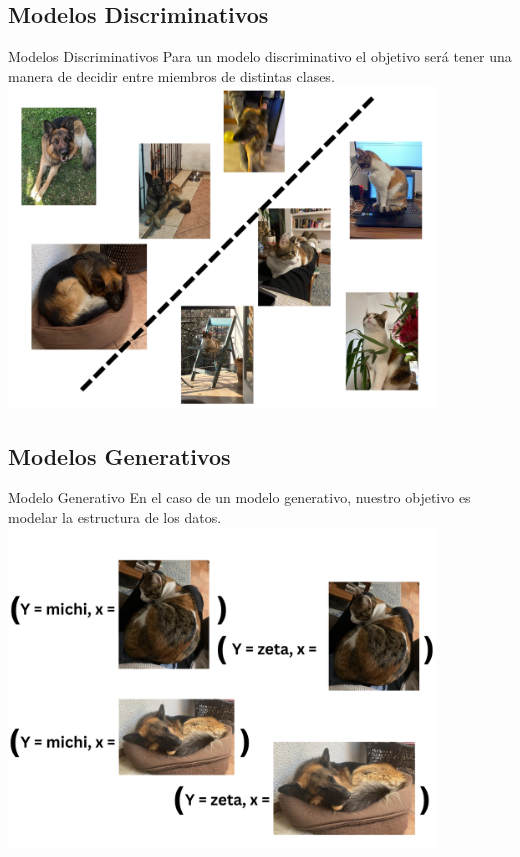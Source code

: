 \documentclass[9pt]{beamer}
\begin{document}
\subsection{Modelos Discriminativos}
\begin{frame}{Modelos Discriminativos}
    Para un modelo discriminativo el objetivo será tener una manera de decidir entre miembros de distintas clases.
    \includegraphics[width=0.85\textwidth]{diapositivas/img/discriminativo.png}
\end{frame}

\subsection{Modelos Generativos}
\begin{frame}{Modelo Generativo}
    En el caso de un modelo generativo, nuestro objetivo es modelar la estructura de los datos.\\
    \centering
    \includegraphics[width=0.85\textwidth]{diapositivas/img/generativo.png}
\end{frame}
\end{document}
